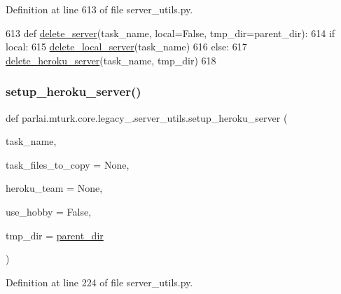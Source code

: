 Definition at line 613 of file server\+\_\+utils.\+py.


\begin{DoxyCode}
613 \textcolor{keyword}{def }\hyperlink{namespaceparlai_1_1mturk_1_1core_1_1server__utils_a3c7c1d82bd4d26eb98ce9711de3cca7c}{delete\_server}(task\_name, local=False, tmp\_dir=parent\_dir):
614     \textcolor{keywordflow}{if} local:
615         \hyperlink{namespaceparlai_1_1mturk_1_1core_1_1server__utils_a9b4f4c3f696be001c2fa96b3690af83c}{delete\_local\_server}(task\_name)
616     \textcolor{keywordflow}{else}:
617         \hyperlink{namespaceparlai_1_1mturk_1_1core_1_1server__utils_a8dfde882f9d6ff492ca565ae2334fc70}{delete\_heroku\_server}(task\_name, tmp\_dir)
618 \end{DoxyCode}
\mbox{\label{namespaceparlai_1_1mturk_1_1core_1_1legacy__2018_1_1server__utils_afa5c0e9444c2d4f19817c07a5a193875}} 
\subsubsection{\texorpdfstring{setup\+\_\+heroku\+\_\+server()}{setup\_heroku\_server()}}
{\footnotesize\ttfamily def parlai.\+mturk.\+core.\+legacy\+\_.\+server\+\_\+utils.\+setup\+\_\+heroku\+\_\+server (\begin{DoxyParamCaption}\item[{}]{task\+\_\+name,  }\item[{}]{task\+\_\+files\+\_\+to\+\_\+copy = {\ttfamily None},  }\item[{}]{heroku\+\_\+team = {\ttfamily None},  }\item[{}]{use\+\_\+hobby = {\ttfamily False},  }\item[{}]{tmp\+\_\+dir = {\ttfamily \hyperlink{namespaceparlai_1_1mturk_1_1core_1_1legacy__2018_1_1server__utils_a6a871d2f8e5c0768a82ab8fa2e7fadae}{parent\+\_\+dir}} }\end{DoxyParamCaption})}



Definition at line 224 of file server\+\_\+utils.\+py.


